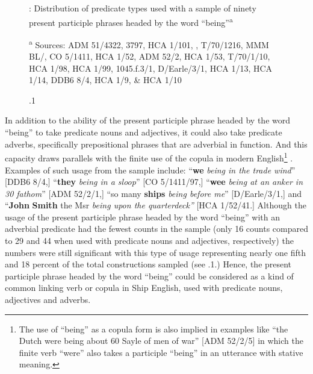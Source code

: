   
\begin{figure}

\caption{\label{fig:key:5}.1}: Distribution of predicate types used with a sample of ninety present participle phrases headed by the word “being”\textsuperscript{a} 

\textsuperscript{a} Sources: ADM 51/4322, 3797, HCA 1/101, \citealt{Brown2011}, T/70/1216, MMM BL/\citealt{Egerton2395}, CO 5/1411, HCA 1/52, ADM 52/2, HCA 1/53, T/70/1/10, HCA 1/98, HCA 1/99, 1045.f.3/1, D/Earle/3/1, HCA 1/13, HCA 1/14, DDB6 8/4, HCA 1/9, \& HCA 1/10
\end{figure}


In addition to the ability of the present participle phrase headed by the word “being” to take predicate nouns and adjectives, it could also take predicate adverbs, specifically prepositional phrases that are adverbial in function. And this capacity draws parallels with the finite use of the copula in modern English\footnote{The use of “being” as a copula form is also implied in examples like “the Dutch were being about 60 Sayle of men of war” [ADM 52/2/5] in which the finite verb “were” also takes a participle “being” in an utterance with stative meaning.} . Examples of such usage from the sample include: “\textbf{we} \textit{being in the trade wind}” [DDB6 8/4,] “\textbf{they} \textit{being in a sloop}” [CO 5/1411/97,] “\textbf{wee} \textit{being at an anker in 30 fathom}” [ADM 52/2/1,] “so many \textbf{ships} \textit{being before me}” [D/Earle/3/1,] and “\textbf{John} \textbf{Smith} the Msr \textit{being upon the quarterdeck”} [HCA 1/52/41.] Although the usage of the present participle phrase headed by the word “being” with an adverbial predicate had the fewest counts in the sample (only 16 counts compared to 29 and 44 when used with predicate nouns and adjectives, respectively) the numbers were still significant with this type of usage representing nearly one fifth and 18 percent of the total constructions sampled (see .1.) Hence, the present participle phrase headed by the word “being” could be considered as a kind of common linking verb or copula in Ship English, used with predicate nouns, adjectives and adverbs. 

